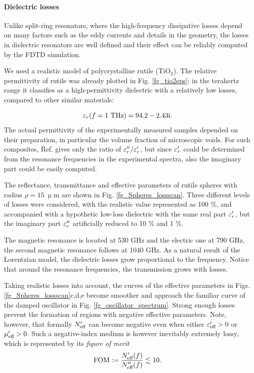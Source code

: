 \paragraph{Dielectric losses}%
Unlike split-ring resonators, where the high-frequency dissipative losses depend on many factors such as the eddy currents and details in the geometry, the losses in dielectric resonators are well defined and their effect can be reliably computed by the FDTD simulation. 

We used a realistic model \cite{baumard1977_epsilon_TiO2} of polycrystalline rutile (TiO$_{2}$). The relative permittivity of rutile was already plotted in Fig. \ref{fg_tio2eps}; in the terahertz range it classifies as a high-permittivity dielectric with a relatively low losses, compared to other similar materials:

\begin{equation}\varepsilon_r(f=1\text{ THz}) = 94.2-2.43\text{i}. \label{eq_tio2}\end{equation}
The actual permittivity of the experimentally measured samples depended on their preparation, in particular the volume fraction of microscopic voids. For such composites, Ref. \cite{baumard1977_epsilon_TiO2} gives only the ratio of $\varepsilon_r''/\varepsilon_r'$, but since $\varepsilon_r'$ could be determined from the resonance frequencies in the experimental spectra, also the imaginary part could be easily computed.

The reflectance, transmittance and effective parameters of rutile spheres with radius $\rho=15\;\upmu$m are shown in Fig. \ref{fg_Spheres_lossscan}. Three different levels of losses were considered, with the realistic value represented as 100 \%, and accompanied with a hypothetic low-loss dielectric with the same real part $\varepsilon_r'$, but the imaginary part $\varepsilon_r''$ artificially reduced to  10 \% and 1 \%. 

The magnetic resonance is located at 530 GHz and the electric one at 790 GHz, the second magnetic resonance follows at 1040 GHz. As a natural result of the Lorentzian model, the dielectric losses grow proportional to the frequency. Notice that around the resonance frequencies, the transmission grows with losses.

Taking realistic losses into account, the curves of the effective parameters in Figs. \ref{fg_Spheres_lossscan}c,d,e become smoother and approach the familiar curve of the damped oscillator in Fig. \ref{fg_oscillator_spectrum}. Strong enough losses prevent the formation of regions with negative effective parameters. Note, however, that formally $N_{\text{eff} }'$ can become negative \cite[pp. 12--15]{pazoutova2011dp} even when either $\varepsilon_{\text{eff} }'>0$ or $\mu_{\text{eff} }'>0$. Such a negative-index medium is however inevitably extremely lossy, which is represented by its \textit{figure of merit}
\begin{equation} \text{FOM} := \frac{N_{\text{eff} }'(f)}{N_{\text{eff} }''(f)} \lesssim 10. \label{eq_}\end{equation}

